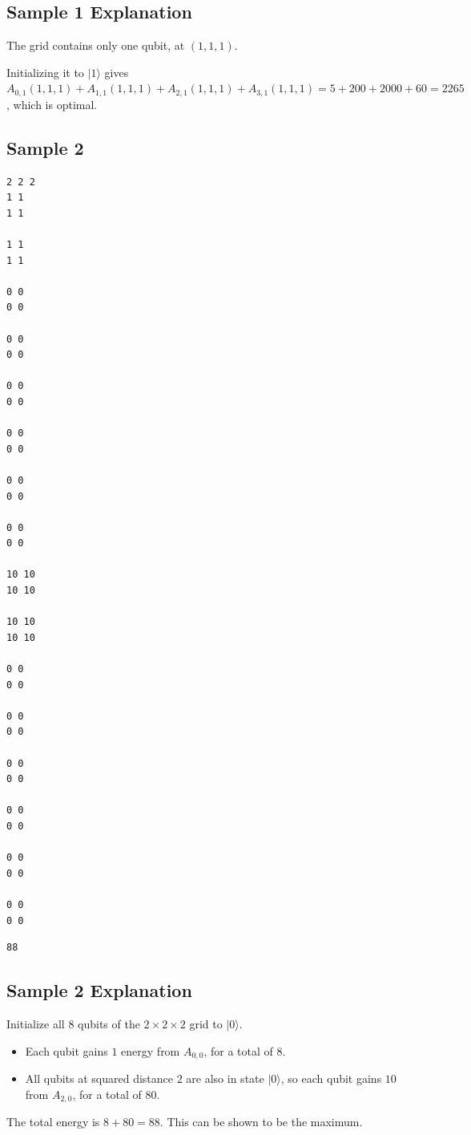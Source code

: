 \subsection{Sample 1 Explanation}

The grid contains only one qubit, at $(1,1,1)$.

Initializing it to $|1\rangle$ gives $A_{0,1}(1,1,1)+A_{1,1}(1,1,1)+A_{2,1}(1,1,1)+A_{3,1}(1,1,1)=5+200+2000+60=2265$, which is optimal.

\subsection{Sample 2}

\begin{minipage}{\linewidth}
	\begin{minipage}[t]{0.49\linewidth}
		\begin{lstlisting}[title=\texttt{standard input}]
2 2 2
1 1
1 1

1 1
1 1

0 0
0 0

0 0
0 0

0 0
0 0

0 0
0 0

0 0
0 0

0 0
0 0

10 10
10 10

10 10
10 10

0 0
0 0

0 0
0 0

0 0
0 0

0 0
0 0

0 0
0 0

0 0
0 0
\end{lstlisting}
	\end{minipage}
	\begin{minipage}[t]{0.49\linewidth}
		\begin{lstlisting}[title=\texttt{standard output}]
88
\end{lstlisting}
	\end{minipage}
\end{minipage}


\subsection{Sample 2 Explanation}

Initialize all $8$ qubits of the $2 \times 2 \times 2$ grid to $|0\rangle$.

\begin{itemize}
	\item Each qubit gains $1$ energy from $A_{0,0}$, for a total of $8$.
	\item All qubits at squared distance $2$ are also in state $|0\rangle$, so each qubit gains $10$ from $A_{2,0}$, for a total of $80$.
\end{itemize}

The total energy is $8+80=88$. This can be shown to be the maximum.
